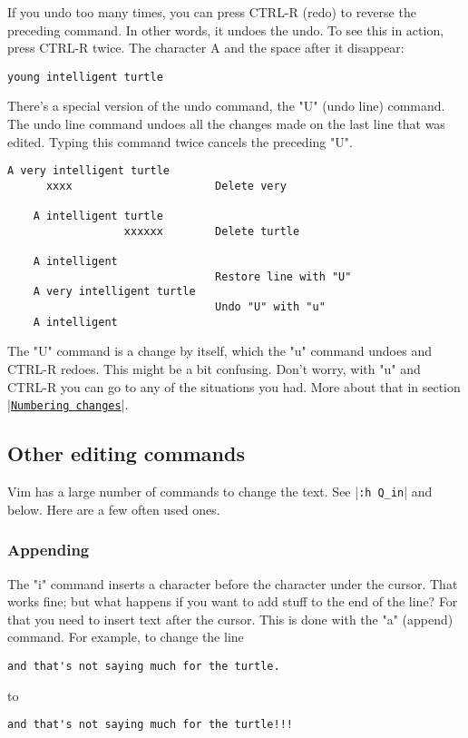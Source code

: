If you undo too many times, you can press CTRL-R (redo) to reverse the preceding command.
In other words, it undoes the undo.
To see this in action, press CTRL-R twice.
The character A and the space after it disappear: 

		\begin{Verbatim}[samepage=true]
    young intelligent turtle 
		\end{Verbatim}

There's a special version of the undo command, the "U" (undo line) command.
The undo line command undoes all the changes made on the last line that was edited.
Typing this command twice cancels the preceding "U".

		\begin{Verbatim}[samepage=true]
    A very intelligent turtle 
      xxxx                      Delete very

    A intelligent turtle 
                  xxxxxx        Delete turtle

    A intelligent 
                                Restore line with "U"
    A very intelligent turtle 
                                Undo "U" with "u"
    A intelligent 
		\end{Verbatim}

The "U" command is a change by itself, which the "u" command undoes and CTRL-R redoes.
This might be a bit confusing.
Don't worry, with "u" and CTRL-R you can go to any of the situations you had.
More about that in section |\hyperref[Numbering changes]{\texttt{Numbering changes}}|.

\subsection{Other editing commands}

Vim has a large number of commands to change the text.
See |\verb!:h Q_in!| and below.
Here are a few often used ones.

\subsubsection{Appending}

The "i" command inserts a character before the character under the cursor.
That works fine; but what happens if you want to add stuff to the end of the line?  For that you need to insert text after the cursor.
This is done with the "a" (append) command.
For example, to change the line 

		\begin{Verbatim}[samepage=true]
    and that's not saying much for the turtle. 
		\end{Verbatim}
to
		\begin{Verbatim}[samepage=true]
    and that's not saying much for the turtle!!! 
		\end{Verbatim}

